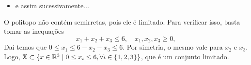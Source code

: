 \begin{questions}
\begin{solution}
\begin{itemize}
        \item e assim sucessivamente...
    \end{itemize}
\end{solution}

\begin{solution}
    O politopo não contém semirretas, pois ele é limitado. Para verificar isso, basta tomar as inequações
    \[x_1+x_2+x_3 \le 6, \quad x_1,x_2,x_3\ge 0,\]
    Daí temos que $0 \le x_1 \le 6-x_2-x_3 \le 6$. Por simetria, o mesmo vale para $x_2$ e $x_3$. Logo, $ \mathbb{X} \subset \{x\in{\mathbb R}^3 \mid 0\le x_i\le 6, \forall i\in\{1,2,3\}\}$, que é um conjunto limitado.
\end{solution}


\end{questions}

